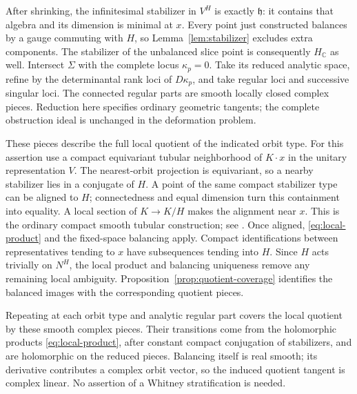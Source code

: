 \documentclass[11pt]{amsart}
\theoremstyle{definition}
\theoremstyle{remark}
\newcommand{\CC}{\mathbb C}
\begin{document}
After shrinking, the infinitesimal stabilizer in $V^H$ is exactly
$\mathfrak h$: it contains that algebra and its dimension is minimal
at $x$. Every point just constructed balances by a gauge commuting
with $H$, so Lemma~\ref{lem:stabilizer} excludes extra components.
The stabilizer of the unbalanced slice point is consequently $H_{\CC}$
as well. Intersect $\Sigma$ with the complete locus $\kappa_p=0$.
Take its reduced analytic space, refine by the determinantal rank loci
of $D\kappa_p$, and take regular loci and successive singular loci.
The connected regular parts are smooth locally closed complex pieces.
Reduction here specifies ordinary geometric tangents; the complete
obstruction ideal is unchanged in the deformation problem.

These pieces describe the full local quotient of the indicated orbit
type. For this assertion use a compact equivariant tubular neighborhood
of $K\cdot x$ in the unitary representation $V$. The nearest-orbit
projection is equivariant, so a nearby stabilizer lies in a conjugate
of $H$. A point of the same compact stabilizer type can be aligned to
$H$; connectedness and equal dimension turn this containment into
equality. A local section of $K\to K/H$ makes the alignment near
$x$. This is the ordinary compact smooth tubular construction; see
\cite[Proposition 2.2.2 and Remark 2.2.3]{Palais61}.
Once aligned, \eqref{eq:local-product} and the fixed-space balancing
apply. Compact identifications between representatives tending to $x$
have subsequences tending into $H$. Since $H$ acts trivially on $N^H$,
the local product and balancing uniqueness remove any remaining local
ambiguity. Proposition~\ref{prop:quotient-coverage} identifies the
balanced images with the corresponding quotient pieces.

Repeating at each orbit type and analytic regular part covers the
local quotient by these smooth complex pieces. Their transitions come
from the holomorphic products \eqref{eq:local-product}, after constant
compact conjugation of stabilizers, and are holomorphic on the reduced
pieces. Balancing itself is real smooth; its derivative contributes a
complex orbit vector, so the induced quotient tangent is complex linear.
No assertion of a Whitney stratification is needed.
\end{document}
